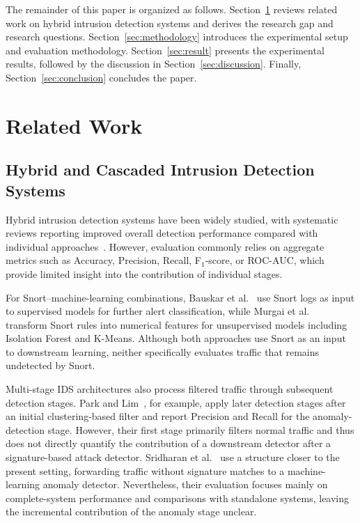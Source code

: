 \documentclass[conference]{IEEEtran}
\begin{document}
The remainder of this paper is organized as follows. Section~\ref{sec:related-work} reviews related work on hybrid intrusion detection systems and derives the research gap and research questions. Section~\ref{sec:methodology} introduces the experimental setup and evaluation methodology. Section~\ref{sec:result} presents the experimental results, followed by the discussion in Section~\ref{sec:discussion}. Finally, Section~\ref{sec:conclusion} concludes the paper.


\section{Related Work}
\label{sec:related-work}

\subsection{Hybrid and Cascaded Intrusion Detection Systems}
\label{subsec:hybrid-cascaded-ids}

Hybrid intrusion detection systems have been widely studied, with
systematic reviews reporting improved overall detection performance
compared with individual approaches~\cite{maseno2022,abdulganiyu2023}.
However, evaluation commonly relies on aggregate metrics such as
Accuracy, Precision, Recall, F$_1$-score, or ROC-AUC, which provide
limited insight into the contribution of individual stages.

For Snort--machine-learning combinations, Bauskar et al.~\cite{bauskar2025}
use Snort logs as input to supervised models for further alert
classification, while Murgai et al.~\cite{murgai2024} transform Snort
rules into numerical features for unsupervised models including
Isolation Forest and K-Means. Although both approaches use Snort as an
input to downstream learning, neither specifically evaluates traffic
that remains undetected by Snort.

Multi-stage IDS architectures also process filtered traffic through
subsequent detection stages. Park and Lim~\cite{park2026}, for example,
apply later detection stages after an initial clustering-based filter
and report Precision and Recall for the anomaly-detection stage.
However, their first stage primarily filters normal traffic and thus
does not directly quantify the contribution of a downstream detector
after a signature-based attack detector. Sridharan et al.~\cite{sridharan2025}
use a structure closer to the present setting, forwarding traffic
without signature matches to a machine-learning anomaly detector.
Nevertheless, their evaluation focuses mainly on complete-system
performance and comparisons with standalone systems, leaving the
incremental contribution of the anomaly stage unclear.
\end{document}
